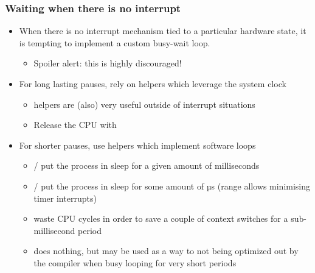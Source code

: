 \begin{frame}[fragile]
  \frametitle{Waiting when there is no interrupt}
  \begin{itemize}
  \item When there is no interrupt mechanism tied to a particular
        hardware state, it is tempting to implement a custom busy-wait loop.
    \begin{itemize}
    \item Spoiler alert: this is highly discouraged!
    \end{itemize}
  \item For long lasting pauses, rely on helpers which leverage the
    system clock
    \begin{itemize}
    \item {} helpers are (also) very useful outside of
      interrupt situations
    \item Release the CPU with 
    \end{itemize}
  \item For shorter pauses, use helpers which implement software loops
    \begin{itemize}
    \item {}/ put the process
      in sleep for a given amount of milliseconds
    \item {}/ put the process in sleep
      for some amount of µs (range allows minimising timer interrupts)
    \item {} waste CPU cycles in order
      to save a couple of context switches for a sub-millisecond period
    \item {} does nothing, but may be used as a way to
      not being optimized out by the compiler when busy looping for very
      short periods
    \end{itemize}
  \end{itemize}
\end{frame}

